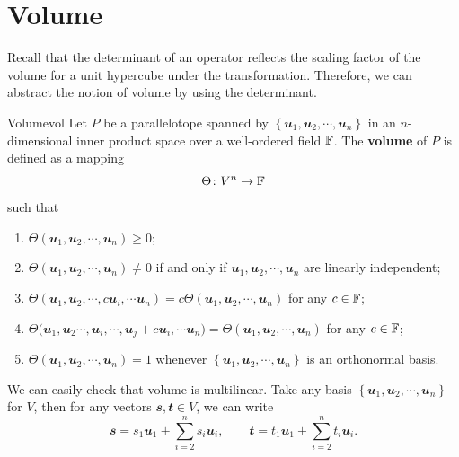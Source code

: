 \documentclass[math]{amznotes}
\theoremstyle{remark}
\begin{document}
\section{Volume}
Recall that the determinant of an operator reflects the scaling factor of the volume for a unit hypercube under the transformation. Therefore, we can abstract the notion of volume by using the determinant.
\begin{dfnbox}{Volume}{vol}
    Let $P$ be a parallelotope spanned by $\left\{\mathbfit{u}_1, \mathbfit{u}_2, \cdots, \mathbfit{u}_n\right\}$ in an $n$-dimensional inner product space over a well-ordered field $\mathbb{F}$. The {\color{red} \textbf{volume}} of $P$ is defined as a mapping 
    \begin{equation*}
        \Theta \colon V^n \to \mathbb{F}
    \end{equation*}
    such that 
    \begin{enumerate}
        \item $\Theta\left(\mathbfit{u}_1, \mathbfit{u}_2, \cdots, \mathbfit{u}_n\right) \geq 0$;
        \item $\Theta\left(\mathbfit{u}_1, \mathbfit{u}_2, \cdots, \mathbfit{u}_n\right) \neq 0$ if and only if $\mathbfit{u}_1, \mathbfit{u}_2, \cdots, \mathbfit{u}_n$ are linearly independent;
        \item $\Theta\left(\mathbfit{u}_1, \mathbfit{u}_2, \cdots, c\mathbfit{u}_i, \cdots \mathbfit{u}_n\right) = c\Theta\left(\mathbfit{u}_1, \mathbfit{u}_2, \cdots, \mathbfit{u}_n\right)$ for any $c \in \mathbb{F}$;
        \item $\Theta\bigl(\mathbfit{u}_1, \mathbfit{u}_2 \cdots, \mathbfit{u}_i, \cdots, \mathbfit{u}_j + c\mathbfit{u}_i, \cdots \mathbfit{u}_n\bigr) = \Theta\left(\mathbfit{u}_1, \mathbfit{u}_2, \cdots, \mathbfit{u}_n\right)$ for any $c \in \mathbb{F}$;
        \item $\Theta\left(\mathbfit{u}_1, \mathbfit{u}_2, \cdots, \mathbfit{u}_n\right) = 1$ whenever $\left\{\mathbfit{u}_1, \mathbfit{u}_2, \cdots, \mathbfit{u}_n\right\}$ is an orthonormal basis.
    \end{enumerate}
\end{dfnbox}
We can easily check that volume is multilinear. Take any basis $\left\{\mathbfit{u}_1, \mathbfit{u}_2, \cdots, \mathbfit{u}_n\right\}$ for $V$, then for any vectors $\mathbfit{s}, \mathbfit{t} \in V$, we can write 
\begin{equation*}
    \mathbfit{s} = s_1\mathbfit{u}_1 + \sum_{i = 2}^{n}s_i\mathbfit{u}_i, \qquad \mathbfit{t} = t_1\mathbfit{u}_1 + \sum_{i = 2}^{n}t_i\mathbfit{u}_i.
\end{equation*}
\end{document}
